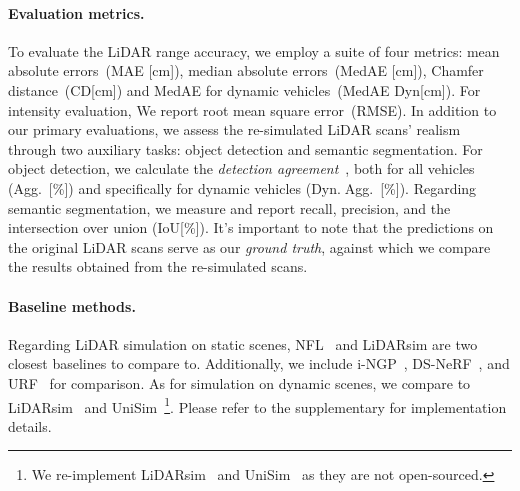 

\paragraph{Evaluation metrics.}\label{sec:metrics}
To evaluate the LiDAR range accuracy, we employ a suite of four metrics: mean absolute errors~(MAE [cm]), median absolute errors~(MedAE [cm]), Chamfer distance~(CD[cm]) and MedAE for dynamic vehicles~(MedAE Dyn[cm]). For intensity evaluation, We report root mean square error~(RMSE).
%
In addition to our primary evaluations, we assess the re-simulated LiDAR scans' realism through two auxiliary tasks: object detection and semantic segmentation. For object detection, we calculate the \textit{detection agreement}~\cite{manivasagam2020lidarsim}, both for all vehicles (Agg.~[\%]) and specifically for dynamic vehicles (Dyn.$\;$Agg.~[\%]). Regarding semantic segmentation, we measure and report recall, precision, and the intersection over union (IoU[\%]). It's important to note that the predictions on the original LiDAR scans serve as our \textit{ground truth}, against which we compare the results obtained from the re-simulated scans.



\paragraph{Baseline methods.}
Regarding LiDAR simulation on static scenes, NFL~\cite{Huang2023nfl} and LiDARsim\cite{manivasagam2020lidarsim} are two closest baselines to compare to. Additionally, we include i-NGP~\cite{mueller2022instant}, DS-NeRF~\cite{kangle2021dsnerf}, and URF~\cite{rematas2022urban} for comparison. As for simulation on dynamic scenes, we compare to LiDARsim~\cite{manivasagam2020lidarsim} and UniSim~\cite{yang2023unisim}\footnote{We re-implement LiDARsim~\cite{lee2015lidar} and UniSim~\cite{yang2023unisim} as they are not open-sourced.}. Please refer to the supplementary for implementation details.


